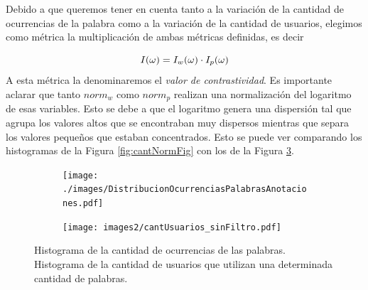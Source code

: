 
Debido a que queremos tener en cuenta tanto a la variación de la cantidad de ocurrencias de la palabra como a la variación de la cantidad de usuarios, elegimos como métrica la multiplicación de ambas métricas definidas, es decir  

\begin{equation}
I(\omega) =  I_w(\omega) \cdot I_p(\omega)\\
\label{eq:ivalor}
\end{equation}
A esta métrica la denominaremos el \textit{valor de contrastividad}.
Es importante aclarar que tanto $norm_{w}$ como $norm_p$ realizan una normalización del logaritmo de esas variables. Esto se debe a que el logaritmo genera una dispersión tal que agrupa los valores altos que se encontraban muy dispersos mientras que separa los valores pequeños que estaban concentrados. Esto se puede ver comparando los histogramas de la Figura \ref{fig:cantNormFig} con los de la Figura \ref{fig:cantPalabrasSinNorm}.




\begin{figure}[!ht]\centering
  \begin{subfigure}[t]{0.49\textwidth}
    \texttt{[image: ./images/DistribucionOcurrenciasPalabrasAnotaciones.pdf]}
    \caption{}
    \label{fig:cantPalabrasAnotaciones} 
   \end{subfigure}
   \begin{subfigure}[t]{0.49\textwidth}
    \texttt{[image: images2/cantUsuarios\_sinFiltro.pdf]}
    \caption{}
    \label{fig:cantUsuarios} 
   \end{subfigure}
   \caption{ Histograma de la cantidad de ocurrencias de las palabras.  Histograma de la cantidad de usuarios que utilizan una determinada cantidad de palabras.} 
   \label{fig:cantPalabrasSinNorm} 
\end{figure}

